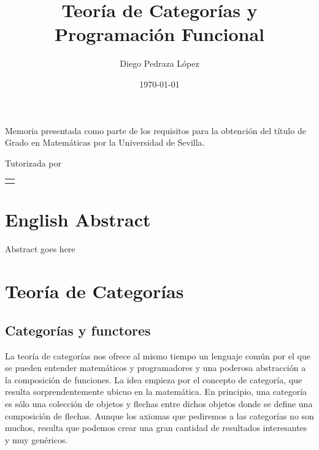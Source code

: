 \documentclass[12pt, twoside]{book}
\title{Teoría de Categorías y Programación Funcional}
\author{Diego Pedraza López}
\date{\today}
\makeatletter
\renewcommand\maketitle{%
  \begin{titlepage}
      \vspace*{1.5cm}
      \parskip=0pt
      \Huge\bfseries
      \begin{center}
          \@title
      \end{center}
      \vspace{1cm}
      \begin{center}
          \@author
      \end{center}
  \end{titlepage}

  \begin{titlepage}
  \parindent=0pt
  \begin{flushleft}
  \vspace*{1.5mm}
  \setlength\baselineskip{0pt}
  \setlength\parskip{0mm}
  \begin{center}
  \end{center}
  \end{flushleft}
  \vspace{1cm}
  \bgroup
  \Large \bfseries
  \begin{center}
  \@title
  \end{center}
  \egroup
  \vspace*{.5cm}
  \begin{center}
  \@author
  \end{center}
  \vspace*{1.8cm}
  \begin{flushright}
  \begin{minipage}{8.45cm}
      Memoria presentada como parte de los requisitos para la obtención del título de
      Grado en Matemáticas por la Universidad de Sevilla.

      \vspace*{7.5mm}

      Tutorizada por
  \end{minipage}\par
  \begin{tabularx}{8.45cm}[b]{@{}l}
      \guardatutores
  \end{tabularx}
   \end{flushright}
      \vspace*{\fill}
   \end{titlepage}
   \pagestyle{tfg}
   \renewcommand{\chaptermark}[1]{\markright{\thechapter.\space ##1}}
   \renewcommand{\sectionmark}[1]{}
   \renewcommand{\subsectionmark}[1]{}
  }
\makeatother
\begin{document}
\maketitle

\frontmatter
\tableofcontents

\mainmatter


\chapter*{English Abstract}

\begin{otherlanguage}{english}
    Abstract goes here
\end{otherlanguage}


\chapter{Teoría de Categorías}

\section{Categorías y functores}

La teoría de categorías nos ofrece al mismo tiempo un lenguaje común por el que se pueden entender matemáticos y programadores y una poderosa abstracción a la composición de funciones.
La idea empieza por el concepto de categoría, que resulta sorprendentemente ubicuo en la matemática.
En principio, una categoría es sólo una colección de objetos y flechas entre dichos objetos donde se define una composición de flechas.
Aunque los axiomas que pediremos a las categorías no son muchos, resulta que podemos crear una gran cantidad de resultados interesantes y muy genéricos.
\end{document}
